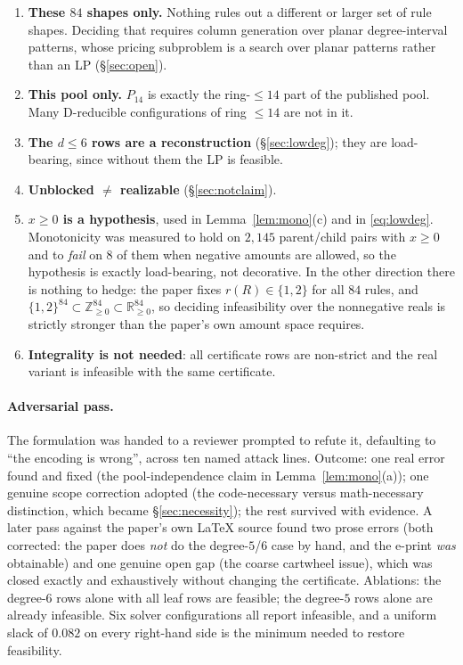 \documentclass[11pt]{article}
\theoremstyle{definition}
\begin{document}
\begin{enumerate}
  \item \textbf{These $84$ shapes only.} Nothing rules out a different or larger set
        of rule shapes. Deciding that requires column generation over planar
        degree-interval patterns, whose pricing subproblem is a search over planar
        patterns rather than an LP (\S\ref{sec:open}).
  \item \textbf{This pool only.} $P_{14}$ is exactly the ring-$\le14$ part of the
        published pool. Many D-reducible configurations of ring $\le14$ are not in it.
  \item \textbf{The $d\le6$ rows are a reconstruction} (\S\ref{sec:lowdeg}); they are
        load-bearing, since without them the LP is feasible.
  \item \textbf{Unblocked $\ne$ realizable} (\S\ref{sec:notclaim}).
  \item \textbf{$x \ge 0$ is a hypothesis}, used in Lemma~\ref{lem:mono}(c) and in
        \eqref{eq:lowdeg}. Monotonicity was measured to hold on $2{,}145$
        parent/child pairs with $x\ge 0$ and to \emph{fail} on $8$ of them when
        negative amounts are allowed, so the hypothesis is exactly load-bearing, not
        decorative. In the other direction there is nothing to hedge: the paper fixes
        $r(R)\in\{1,2\}$ for all $84$ rules, and
        $\{1,2\}^{84}\subset\mathbb{Z}_{\ge0}^{84}\subset\mathbb{R}_{\ge0}^{84}$, so
        deciding infeasibility over the nonnegative reals is strictly stronger than
        the paper's own amount space requires.
  \item \textbf{Integrality is not needed}: all certificate rows are non-strict and
        the real variant is infeasible with the same certificate.
\end{enumerate}

\paragraph{Adversarial pass.} The formulation was handed to a reviewer prompted to
refute it, defaulting to ``the encoding is wrong'', across ten named attack lines.
Outcome: one real error found and fixed (the pool-independence claim in
Lemma~\ref{lem:mono}(a)); one genuine scope correction adopted (the code-necessary
versus math-necessary distinction, which became \S\ref{sec:necessity}); the rest
survived with evidence. A later pass against the paper's own LaTeX source found two
prose errors (both corrected: the paper does \emph{not} do the degree-$5$/$6$ case by
hand, and the e-print \emph{was} obtainable) and one genuine open gap (the coarse
cartwheel issue), which was closed exactly and exhaustively without changing the
certificate. Ablations: the degree-$6$ rows alone with all leaf rows are feasible;
the degree-$5$ rows alone are already infeasible. Six solver configurations all
report infeasible, and a uniform slack of $0.082$ on every right-hand side is the
minimum needed to restore feasibility.
\end{document}
